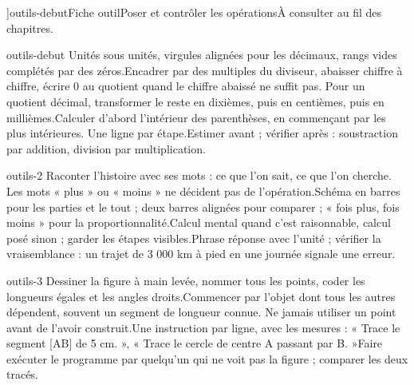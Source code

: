 \editionPage[\pdfbookmark[0]{Fiches outils}{bm-outils-debut-parent}]{outils-debut}{Fiche outil}{Poser et contrôler les opérations}{À consulter au fil des chapitres.}
\begin{blocEdition}{outils-debut}
Unités sous unités, virgules alignées pour les décimaux, rangs vides complétés par des zéros.Encadrer par des multiples du diviseur, abaisser chiffre à chiffre, écrire 0 au quotient quand le chiffre abaissé ne suffit pas. Pour un quotient décimal, transformer le reste en dixièmes, puis en centièmes, puis en millièmes.Calculer d’abord l’intérieur des parenthèses, en commençant par les plus intérieures. Une ligne par étape.Estimer avant ; vérifier après : soustraction par addition, division par multiplication.
\end{blocEdition}
\begin{blocEdition}{outils-2}
Raconter l’histoire avec ses mots : ce que l’on sait, ce que l’on cherche. Les mots « plus » ou « moins » ne décident pas de l’opération.Schéma en barres pour les parties et le tout ; deux barres alignées pour comparer ; « fois plus, fois moins » pour la proportionnalité.Calcul mental quand c’est raisonnable, calcul posé sinon ; garder les étapes visibles.Phrase réponse avec l’unité ; vérifier la vraisemblance : un trajet de 3 000 km à pied en une journée signale une erreur.
\end{blocEdition}
\begin{blocEdition}{outils-3}
Dessiner la figure à main levée, nommer tous les points, coder les longueurs égales et les angles droits.Commencer par l’objet dont tous les autres dépendent, souvent un segment de longueur connue. Ne jamais utiliser un point avant de l’avoir construit.Une instruction par ligne, avec les mesures : « Trace le segment [AB] de 5 cm. », « Trace le cercle de centre A passant par B. »Faire exécuter le programme par quelqu’un qui ne voit pas la figure ; comparer les deux tracés.
\end{blocEdition}
